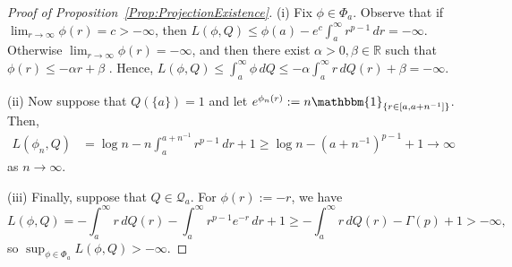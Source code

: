 \documentclass[a4paper,12pt]{article}
\begin{document}
\begin{proof}[Proof of Proposition~\ref{Prop:ProjectionExistence}]
(i) Fix $\phi \in \Phi_{a}$. Observe that if $\lim_{r \rightarrow \infty} \phi(r) = c > -\infty$, then $L(\phi, Q) \leq \phi(a) - e^c \int_{a}^\infty r^{p-1} \, dr = -\infty$.  Otherwise $\lim_{r \rightarrow \infty} \phi(r) = -\infty$, and then there exist $\alpha > 0, \beta \in \mathbb{R}$ such that $ \phi(r) \leq -\alpha r+ \beta$ \citep[][Lemma~1]{cule2010theoretical}. Hence, $L( \phi, Q) \leq \int_{a}^\infty \phi \, dQ \leq - \alpha \int_{a}^\infty r \, dQ(r) + \beta = - \infty$. 

(ii) Now suppose that $Q(\{a\}) = 1$ and let $e^{\phi_n(r)} := n \mathbbm{1}_{\{ r \in [a, a + n^{-1}]\}}$. Then, 
\begin{align*}
L(\phi_n, Q) &= \log n - n \int_{a}^{a + n^{-1}} r^{p-1}\, dr + 1 \geq \log n - (a + n^{-1})^{p-1} + 1 \rightarrow \infty
\end{align*}
as $n \rightarrow \infty$.

(iii) Finally, suppose that $Q \in \mathcal{Q}_{a}$.  For $\phi(r) := -r$, we have
\[
  L(\phi, Q) = - \int_{a}^\infty r\, dQ(r) - \int_{a}^\infty r^{p-1} e^{-r} \, dr + 1 \geq - \int_{a}^\infty r\,dQ(r)  - \Gamma(p) + 1 > - \infty,
  \]
so $\sup_{\phi \in \Phi_{a}} L(\phi, Q) > -\infty$.


\end{proof}
\end{document}
